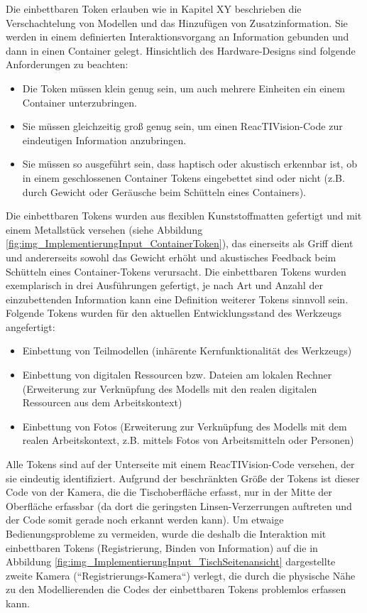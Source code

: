 Die einbettbaren Token erlauben wie in Kapitel XY beschrieben die Verschachtelung von Modellen und das Hinzufügen von Zusatzinformation. Sie werden in einem definierten Interaktionsvorgang an Information gebunden und dann in einen Container gelegt. Hinsichtlich des Hardware-Designs sind folgende Anforderungen zu beachten:
\begin{itemize}
	\item Die Token müssen klein genug sein, um auch mehrere Einheiten ein einem Container unterzubringen.
	\item Sie müssen gleichzeitig groß genug sein, um einen ReacTIVision-Code zur eindeutigen Information anzubringen.
	\item Sie müssen so ausgeführt sein, dass haptisch oder akustisch erkennbar ist, ob in einem geschlossenen Container Tokens eingebettet sind oder nicht (z.B. durch Gewicht oder Geräusche beim Schütteln eines Containers).
\end{itemize}

Die einbettbaren Tokens wurden aus flexiblen Kunststoffmatten gefertigt und mit einem Metallstück versehen (siehe Abbildung \ref{fig:img_ImplementierungInput_ContainerToken}), das einerseits als Griff dient und andererseits sowohl das Gewicht erhöht und akustisches Feedback beim Schütteln eines Container-Tokens verursacht. Die einbettbaren Tokens wurden exemplarisch in drei Ausführungen gefertigt, je nach Art und Anzahl der einzubettenden Information kann eine Definition weiterer Tokens sinnvoll sein. Folgende Tokens wurden für den aktuellen Entwicklungsstand des Werkzeugs angefertigt:
\begin{itemize}
	\item Einbettung von Teilmodellen (inhärente Kernfunktionalität des Werkzeugs)
	\item Einbettung von digitalen Ressourcen bzw. Dateien am lokalen Rechner (Erweiterung zur Verknüpfung des Modells mit den realen digitalen Ressourcen aus dem Arbeitskontext)
	\item Einbettung von Fotos (Erweiterung zur Verknüpfung des Modells mit dem realen Arbeitskontext, z.B. mittels Fotos von Arbeitsmitteln oder Personen)
\end{itemize}

Alle Tokens sind auf der Unterseite mit einem ReacTIVision-Code versehen, der sie eindeutig identifiziert. Aufgrund der beschränkten Größe der Tokens ist dieser Code von der Kamera, die die Tischoberfläche erfasst, nur in der Mitte der Oberfläche erfassbar (da dort die geringsten Linsen-Verzerrungen auftreten und der Code somit gerade noch erkannt werden kann). Um etwaige Bedienungsprobleme zu vermeiden, wurde die deshalb die Interaktion mit einbettbaren Tokens (Registrierung, Binden von Information) auf die in Abbildung \ref{fig:img_ImplementierungInput_TischSeitenansicht} dargestellte zweite Kamera (“Registrierungs-Kamera“) verlegt, die durch die physische Nähe zu den Modellierenden die Codes der einbettbaren Tokens problemlos erfassen kann.

